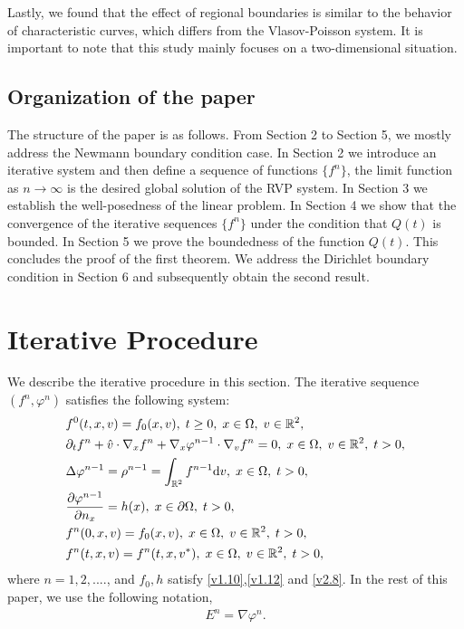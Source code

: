 \documentclass[11pt,reqno]{amsart}%
\theoremstyle{definition}
\theoremstyle{remark}
\begin{document}
Lastly, we found that the effect of regional boundaries is similar to the behavior of characteristic curves, which differs from the Vlasov-Poisson system. It is important to note that this study mainly focuses on a two-dimensional situation.


\subsection{Organization of the paper}

The structure of the paper is as follows.
From Section 2 to Section 5, we mostly address the Newmann boundary condition case.
In Section 2 we introduce  an iterative system and then  define a sequence of functions $\{ f^{n}\}$,  the
limit function as $ n \rightarrow \infty$ is the desired global solution of the RVP system.
In Section 3 we establish the well-posedness of the linear problem.
In Section 4 we show that the convergence of the iterative sequences $ \{ f^{n}\}$  under the condition that $Q (t)$ is bounded.
In Section 5 we prove the boundedness of the function $Q (t)$.  This concludes the proof of the first theorem.
We address the Dirichlet boundary condition in Section 6 and subsequently obtain the second result.




\bigskip

\section{Iterative Procedure}
We describe the iterative procedure in this section. The iterative sequence $(f^{n},\varphi^{n})$ satisfies the following system: %
\begin{align}
&f^{0}(t,x,v)=f_{0}(x,v),\; t\geq0,\; x\in\Omega,\; v\in \mathbb{R}^{2}, \label{v3.1}\\
&\partial_t f^{n}+\hat{v}\cdot\nabla_{x}f^{n}+\nabla_{x}\varphi^{n-1}\cdot\nabla_{v}f^{n}=0, \; x\in \Omega, \; v\in \mathbb{R}^{2}, \; t>0, \label{v3.2}\\
&\Delta\varphi^{n-1}=\rho^{n-1}=\int_{\mathbb{R}^{2}}f^{n-1}{\rm d}v, \; x\in \Omega, \; t>0, \label{v3.3}\\
&\frac{\partial \varphi^{n-1}}{\partial n_{x}}=h(x), \; x\in \partial \Omega, \; t>0,\label{v3.4}\\
&f^{n}(0,x,v)=f_{0}(x,v), \; x\in \Omega, \; v\in \mathbb{R}^{2}, \; t>0,\label{v3.5}\\
&f^{n}(t,x,v)=f^{n}(t,x,v^{*}), \; x\in \Omega,\;  v\in \mathbb{R}^{2}, \; t>0, \label{v3.6}
\end{align}
where $n=1,2,....$, and $f_{0},h$ satisfy \eqref{v1.10},\eqref{v1.12} and \eqref{v2.8}.
In the rest of this paper, we use the following notation,
\begin{align}
E^{n}=\nabla \varphi^{n}.  \label{v3.7}
\end{align}
\end{document}
